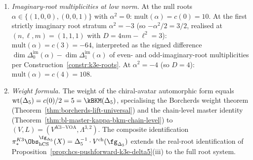 \begin{theorem}
\begin{enumerate}[label=\textup{(\roman*)}]
 \item \emph{Imaginary-root multiplicities at low norm.} At the null roots $\alpha \in \{(1,0,0), (0,0,1)\}$ with $\alpha^2 = 0$: $\mathrm{mult}(\alpha) = c(0) = 10$. At the first strictly imaginary root stratum $\alpha^2 = -3$ (so $-\alpha^2/2 = 3/2$, realised at $(n, \ell, m) = (1, 1, 1)$ with $D = 4nm - \ell^2 = 3$): $\mathrm{mult}(\alpha) = c(3) = -64$, interpreted as the signed difference $\dim \Delta^{\mathrm{im}}_0(\alpha) - \dim \Delta^{\mathrm{im}}_1(\alpha)$ of even- and odd-imaginary-root multiplicities per Construction~\ref{constr:k3e-roots}. At $\alpha^2 = -4$ (so $D = 4$): $\mathrm{mult}(\alpha) = c(4) = 108$.
 \item \emph{Weight formula.} The weight of the chiral-avatar automorphic form equals $\mathrm{wt}(\Delta_5) = c(0)/2 = 5 = \kBKM(\Delta_5)$, specialising the Borcherds weight theorem \textup{(}Theorem~\ref{thm:borcherds-lift-universal}\textup{)} and the chain-level master identity \textup{(}Theorem~\ref{thm:bl-master-kappa-bkm-chain-level}\textup{)} to $(V, L) = (V^{K3\mathrm{-VOA}}, \Lambda^{3,2})$. The composite identification $\pi_*^{K3} \Obs_{\hCS}^{\fg_{\Delta_5}}(X) = \Delta_5^{-1} \cdot V^{\mathrm{ch}}(\fg_{\Delta_5})$ extends the real-root identification of Proposition~\ref{prop:hcs-pushforward-k3e-delta5}(iii) to the full root system.
\end{enumerate}
\end{theorem}

